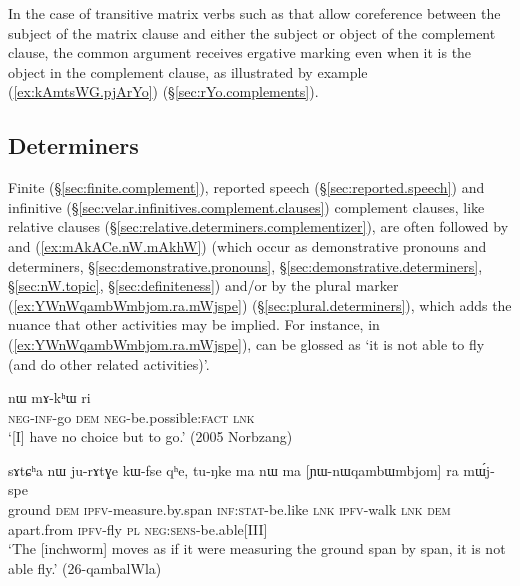 In the case of transitive matrix verbs such as  that allow coreference between the subject of the matrix clause and either the subject or object of the complement clause, the common argument receives ergative marking even when it is the object in the complement clause, as illustrated by example (\ref{ex:kAmtsWG.pjArYo}) (§\ref{sec:rYo.complements}).

\subsection{Determiners} \label{sec:complement.determiner}
Finite (§\ref{sec:finite.complement}), reported speech (§\ref{sec:reported.speech}) and infinitive (§\ref{sec:velar.infinitives.complement.clauses}) complement clauses, like relative clauses (§\ref{sec:relative.determiners.complementizer}), are often followed by  and  (\ref{ex:mAkACe.nW.mAkhW})  (which occur as  demonstrative pronouns and determiners, §\ref{sec:demonstrative.pronouns}, §\ref{sec:demonstrative.determiners}, §\ref{sec:nW.topic}, §\ref{sec:definiteness}) and/or by the plural marker  (\ref{ex:YWnWqambWmbjom.ra.mWjspe}) (§\ref{sec:plural.determiners}), which adds the nuance that other activities may be implied. For instance, in (\ref{ex:YWnWqambWmbjom.ra.mWjspe}),  can be glossed as `it is not able to fly (and do other related activities)'.

 \begin{exe}
\ex \label{ex:mAkACe.nW.mAkhW}
\gll [mɤ-kɤ-ɕe] nɯ mɤ-kʰɯ ri \\
\textsc{neg}-\textsc{inf}-go \textsc{dem} \textsc{neg}-be.possible:\textsc{fact} \textsc{lnk} \\
\glt `[I] have no choice but to go.' (2005 Norbzang)
\end{exe}

 \begin{exe}
\ex \label{ex:YWnWqambWmbjom.ra.mWjspe}
\gll  sɤtɕʰa nɯ ju-rɤtɣe kɯ-fse qʰe, tu-ŋke ma nɯ ma [ɲɯ-nɯqambɯmbjom] ra mɯ́j-spe \\
ground \textsc{dem} \textsc{ipfv}-measure.by.span \textsc{inf}:\textsc{stat}-be.like \textsc{lnk} \textsc{ipfv}-walk \textsc{lnk} \textsc{dem} apart.from \textsc{ipfv}-fly \textsc{pl} \textsc{neg}:\textsc{sens}-be.able[III] \\
\glt `The [inchworm] moves as if it were measuring the ground span by span, it is not able fly.' (26-qambalWla)
\end{exe}
 
